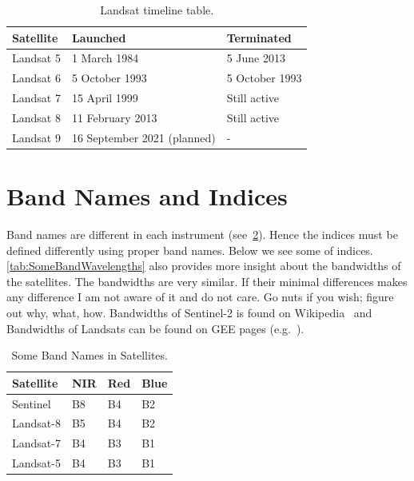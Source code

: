 \begin{table}[]
\centering
\caption{Landsat timeline table.} 
\label{tab:ElevationTable}
\begin{tabular}{|l|l|l|}
\hline
\rowcolor{shadecolor} 
\small{Satellite} & 
\small{Launched} & 
\small{Terminated} \\
\hline
Landsat 5 & 1 March 1984 & 5 June 2013 \\ 
\hline
\rowcolor{aliceblue} 
Landsat 6 & 5 October 1993  & 5 October 1993 \\ \hline
Landsat 7 & 15 April 1999 & Still active \\ \hline
\rowcolor{aliceblue} 
Landsat 8 & 11 February 2013 & Still active \\ \hline
Landsat 9 & 16 September 2021 (planned) & - \\ \hline
\end{tabular}
\end{table}

\section{Band Names and Indices}
\label{sec:Band_Names_and_Indices}
Band names are different in each instrument
(see~\cref{tab:BandNameTable}).
Hence the indices must be defined differently
using proper band names.
Below we see some of indices.
\cref{tab:SomeBandWavelengths} also provides
more insight about the bandwidths of the satellites.
The bandwidths are very similar. If their
minimal differences makes any difference I am not aware of it and do not care. 
Go nuts if you wish; figure out why, what, how.
Bandwidths of Sentinel-2 is found on Wikipedia~\cite{SentinelBandwidths}
and Bandwidths of Landsats can be found on GEE pages (e.g.~\citep{Landsat7T1SRBandWidths}).

\begin{table}[]
\centering
\caption{Some Band Names in Satellites.} 
\label{tab:BandNameTable}
\begin{tabular}{|l|l|l|l|}
\hline
\rowcolor{shadecolor} 
\small{Satellite} & 
\small{NIR} & 
\small{Red}  &
\small{Blue} \\
\hline
Sentinel & B8 & B4 & B2\\ 
\hline
\rowcolor{aliceblue} 
Landsat-8 & B5 & B4 & B2\\ 
\hline
Landsat-7 & B4 & B3 & B1\\ 
\hline
\rowcolor{aliceblue} 
Landsat-5 & B4 & B3 & B1\\ 
\hline
\end{tabular}
\end{table}


